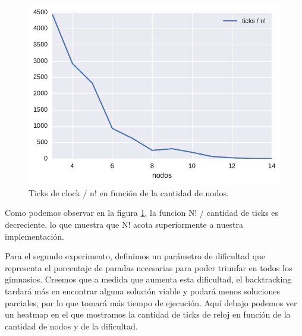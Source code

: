 \begin{figure}[H]
  \begin{center}
    \includegraphics[scale = 0.5]{imagenes/ej1_complejidad.pdf}
    \caption{Ticks de clock / n! en función de la cantidad de nodos.}
    \label{fig:ej1_complejidad}
  \end{center}
\end{figure}

Como podemos observar en la figura \ref{fig:ej1_complejidad}, la funcion N! / cantidad de ticks es decreciente, lo que muestra que N! acota superiormente a nuestra implementación.


Para el segundo experimento, definimos un parámetro de dificultad que representa el porcentaje de paradas necesarias para poder triunfar en todos los gimnasios. Creemos que a medida que aumenta esta dificultad, el backtracking tardará más en encontrar alguna solución viable y podará menos soluciones parciales, por lo que tomará más tiempo de ejecución.
Aquí debajo podemos ver un heatmap en el que mostramos la cantidad de ticks de reloj en función de la cantidad de nodos y de la dificultad.

